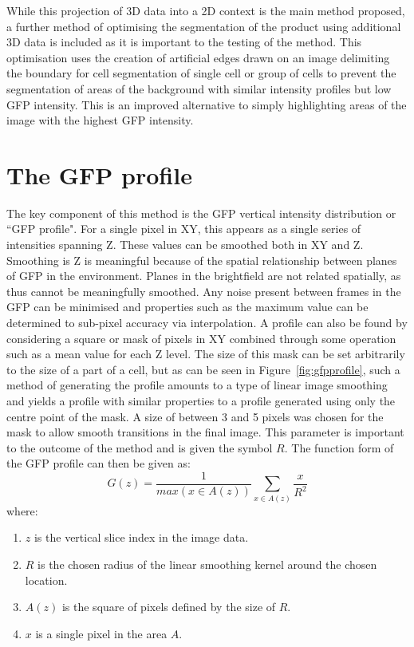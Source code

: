 While this projection of 3D data into a 2D context is the main method proposed, a further method of optimising the segmentation of the product using additional 3D data is included as it is important to the testing of the method. This optimisation uses the creation of artificial edges drawn on an image delimiting the boundary for cell segmentation of single cell or group of cells to prevent the segmentation of areas of the background with similar intensity profiles but low GFP intensity. This is an improved alternative to simply highlighting areas of the image with the highest GFP intensity.

\section{The GFP profile}

The key component of this method is the GFP vertical intensity distribution or ``GFP profile". For a single pixel in XY, this appears as a single series of intensities spanning Z. These values can be smoothed both in XY and Z. Smoothing is Z is meaningful because of the spatial relationship between planes of GFP in the environment. Planes in the brightfield are not related spatially, as thus cannot be meaningfully smoothed. Any noise present between frames in the GFP can be minimised and properties such as the maximum value can be determined to sub-pixel accuracy via interpolation. A profile can also be found by considering a square or mask of pixels in XY combined through some operation such as a mean value for each Z level. The size of this mask can be set arbitrarily to the size of a part of a cell, but as can be seen in Figure~\ref{fig:gfpprofile}, such a method of generating the profile amounts to a type of linear image smoothing and yields a profile with similar properties to a profile generated using only the centre point of the mask. A size of between 3 and 5 pixels was chosen for the mask to allow smooth transitions in the final image. This parameter is important to the outcome of the method and is given the symbol $R$. The function form of the GFP profile can then be given as:
\begin{equation}
G(z) = \frac{1}{max(x \in A(z))}\sum_{x \in A(z)} \frac{x}{R^2}
\end{equation}
where:
\begin{enumerate}
	\item $z$ is the vertical slice index in the image data.
	\item $R$ is the chosen radius of the linear smoothing kernel around the chosen location.
	\item $A(z)$ is the square of pixels defined by the size of $R$.
	\item $x$ is a single pixel in the area $A$.
\end{enumerate}


